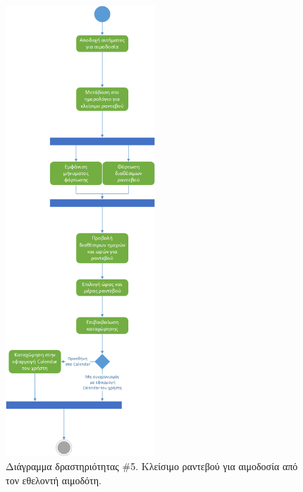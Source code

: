 		
		\begin{figure}[H]
		    \centering
		    \includegraphics[width=0.5\textwidth]{CreateReservation.png}
		    \caption{Διάγραμμα δραστηριότητας \#5. Κλείσιμο ραντεβού για αιμοδοσία από τον εθελοντή αιμοδότη.}
		    \label{fig:createAppoint}
		\end{figure}
		
